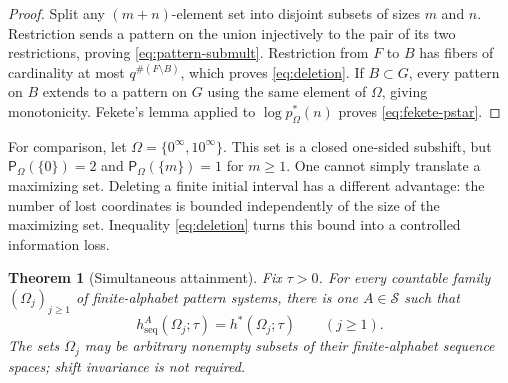 \documentclass[11pt,reqno]{amsart}
\numberwithin{equation}{section}
\newtheorem{theorem}{Theorem}[section]
\theoremstyle{definition}
\theoremstyle{definition}
\newcommand{\Patt}{\mathsf P}
\newcommand{\hseq}{h_{\mathrm{seq}}}
\newcommand{\hpat}{h^{*}}
\begin{document}
\begin{proof}
Split any $(m+n)$-element set into disjoint subsets of sizes $m$ and $n$.
Restriction sends a pattern on the union injectively to the pair of its two
restrictions, proving \eqref{eq:pattern-submult}.  Restriction from $F$ to
$B$ has fibers of cardinality at most $q^{\#(F\setminus B)}$, which proves
\eqref{eq:deletion}.  If $B\subset G$, every pattern on $B$ extends to a
pattern on $G$ using the same element of $\Omega$, giving monotonicity.
Fekete's lemma applied to $\log p_\Omega^*(n)$ proves
\eqref{eq:fekete-pstar}.
\end{proof}

For comparison, let $\Omega=\{0^\infty,10^\infty\}$. This set is a
closed one-sided subshift, but
$\Patt_\Omega(\{0\})=2$ and $\Patt_\Omega(\{m\})=1$ for $m\ge1$.
One cannot simply translate a maximizing set. Deleting a finite initial
interval has a different advantage: the number of lost coordinates is
bounded independently of the size of the maximizing set. Inequality
\eqref{eq:deletion} turns this bound into a controlled information loss.

\begin{theorem}[Simultaneous attainment]\label{thm:A}
Fix $\tau>0$.  For every countable family
$(\Omega_j)_{j\ge1}$ of finite-alphabet pattern systems, there is one
$A\in\mathscr S$ such that
\begin{equation}\label{eq:simultaneous-attainment}
 \hseq^A(\Omega_j;\tau)=\hpat(\Omega_j;\tau)
 \qquad(j\ge1).
\end{equation}
The sets $\Omega_j$ may be arbitrary nonempty subsets of their
finite-alphabet sequence spaces; shift invariance is not required.
\end{theorem}
\end{document}
